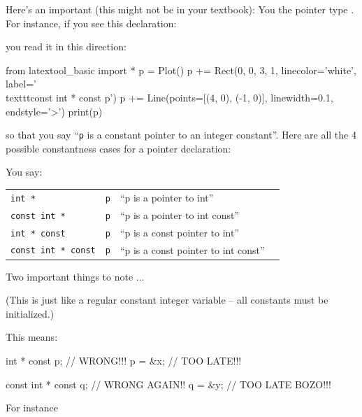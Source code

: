 Here's an important  (this might not be in your textbook): You  the pointer type . For instance, if you see this declaration:


you read it in this direction:
\begin{python}
from latextool_basic import *
p = Plot()
p += Rect(0, 0, 3, 1, linecolor='white', label='\\texttt{const int * const p}')
p += Line(points=[(4, 0), (-1, 0)], linewidth=0.1, endstyle='>')
print(p)
\end{python}    
so that you say ``\texttt{p} is a constant pointer to an integer constant''. Here are all the 4 possible constantness cases for a pointer declaration:

You say:




\begin{tabular}{l l l l}
    \texttt{int *} & \texttt{p} &  ``p is a pointer to int'' \\
    \texttt{const int *} & \texttt{p} &  ``p is a pointer to int const''\\
    \texttt{int * const} & \texttt{p} &  ``p is a const pointer to int'' \\
    \texttt{const int * const} & \texttt{p} &  ``p is a const pointer to int const''\\
\end{tabular}


Two important things to note ...

 (This is just like a regular constant integer variable -- all constants must be initialized.)

This means:

\begin{consolethree}[escapeinside=||]
int * const p;          // WRONG!!!
p = &x;                 // TOO LATE!!!

const int * const q;    // WRONG AGAIN!!
q = &y;                 // TOO LATE BOZO!!!
\end{consolethree}
 For instance

